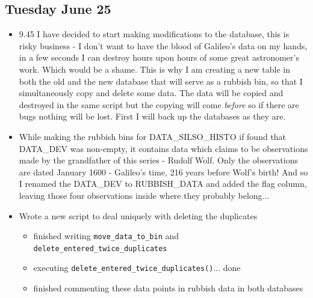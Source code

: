\documentclass[12pt]{article}
\begin{document}
\subsection{Tuesday June 25}
\begin{itemize}
    \item 9.45 I have decided to start making modifications to the database, this is risky business - I don't want to have the blood of Galileo's data on my hands, in a few seconds I can destroy hours upon hours of some great astronomer's work. Which would be a shame. This is why I am creating a new table in both the old and the new database that will serve as a rubbish bin, so that I simultaneously copy and delete some data. The data will be copied and destroyed in the same script but the copying will come \textit{before} so if there are bugs nothing will be lost. First I will back up the databases as they are.
    \item While making the rubbish bins for DATA\_SILSO\_HISTO if found that DATA\_DEV was non-empty, it contains data which claims to be observations made by the grandfather of this series - Rudolf Wolf. Only the observations are dated January 1600 - Galileo's time, 216 years before Wolf's birth! And so I renamed the DATA\_DEV to RUBBISH\_DATA and added the flag column, leaving those four observations inside where they probably belong...
    \item Wrote a new script to deal uniquely with deleting the duplicates
    \begin{itemize}
        \item finished writing \texttt{move\_data\_to\_bin} and \texttt{delete\_entered\_twice\_duplicates}
        \item executing \texttt{delete\_entered\_twice\_duplicates()}... done
        \item finished commenting these data points in rubbish data in both databases
    \end{itemize}
\end{itemize}
    
\end{document}
